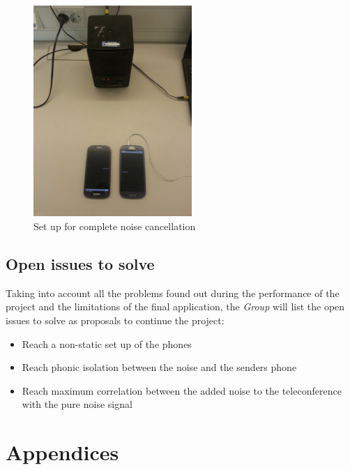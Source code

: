 \documentclass[11pt,a4paper,english]{book}  %
\theoremstyle{definition}  %
\theoremstyle{plain}  %
\theoremstyle{remark}  %
\begin{document}
		\begin{figure}[h]
		\centering
		\includegraphics[width=6cm]{images/android/setup.jpg}
		\caption{Set up for complete noise cancellation}
		\label{fig:setup}
		\end{figure}


\section{Open issues to solve}

Taking into account all the problems found out during the performance of the project and the limitations of the final application, the \textit{Group} will list the open issues to solve as proposals to continue the project:

\begin{itemize}
\item Reach a non-static set up of the phones
\item Reach phonic isolation between the noise and the senders phone
\item Reach maximum correlation between the added noise to the teleconference with the pure noise signal 
\end{itemize}



\chapter{Appendices}
\label{sec:appendix}







\end{document}
